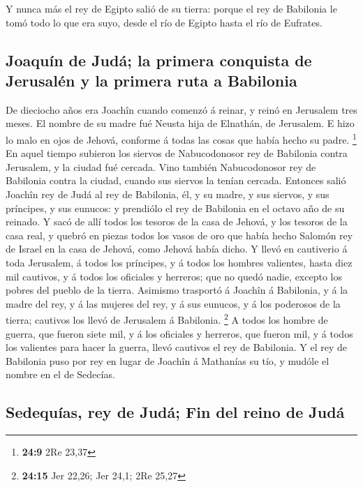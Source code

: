  Y nunca más el rey de Egipto salió de su tierra: porque
el rey de Babilonia le tomó todo lo que era suyo, desde el río de Egipto
hasta el río de Eufrates.

\hypertarget{joaquuxedn-de-juduxe1-la-primera-conquista-de-jerusaluxe9n-y-la-primera-ruta-a-babilonia}{%
\subsection{Joaquín de Judá; la primera conquista de Jerusalén y la
primera ruta a
Babilonia}\label{joaquuxedn-de-juduxe1-la-primera-conquista-de-jerusaluxe9n-y-la-primera-ruta-a-babilonia}}

 De dieciocho años era Joachîn cuando comenzó á reinar, y
reinó en Jerusalem tres meses. El nombre de su madre fué Neusta hija de
Elnathán, de Jerusalem.  E hizo lo malo en ojos de Jehová,
conforme á todas las cosas que había hecho su padre. \footnote{\textbf{24:9}
  2Re 23,37}  En aquel tiempo subieron los siervos de
Nabucodonosor rey de Babilonia contra Jerusalem, y la ciudad fué
cercada.  Vino también Nabucodonosor rey de Babilonia
contra la ciudad, cuando sus siervos la tenían cercada. 
Entonces salió Joachîn rey de Judá al rey de Babilonia, él, y su madre,
y sus siervos, y sus príncipes, y sus eunucos: y prendiólo el rey de
Babilonia en el octavo año de su reinado.  Y sacó de allí
todos los tesoros de la casa de Jehová, y los tesoros de la casa real, y
quebró en piezas todos los vasos de oro que había hecho Salomón rey de
Israel en la casa de Jehová, como Jehová había dicho.  Y
llevó en cautiverio á toda Jerusalem, á todos los príncipes, y á todos
los hombres valientes, hasta diez mil cautivos, y á todos los oficiales
y herreros; que no quedó nadie, excepto los pobres del pueblo de la
tierra.  Asimismo trasportó á Joachîn á Babilonia, y á la
madre del rey, y á las mujeres del rey, y á sus eunucos, y á los
poderosos de la tierra; cautivos los llevó de Jerusalem á Babilonia.
\footnote{\textbf{24:15} Jer 22,26; Jer 24,1; 2Re 25,27} 
A todos los hombre de guerra, que fueron siete mil, y á los oficiales y
herreros, que fueron mil, y á todos los valientes para hacer la guerra,
llevó cautivos el rey de Babilonia.  Y el rey de
Babilonia puso por rey en lugar de Joachîn á Mathanías su tío, y mudóle
el nombre en el de Sedecías.

\hypertarget{sedequuxedas-rey-de-juduxe1-fin-del-reino-de-juduxe1}{%
\subsection{Sedequías, rey de Judá; Fin del reino de
Judá}\label{sedequuxedas-rey-de-juduxe1-fin-del-reino-de-juduxe1}}

